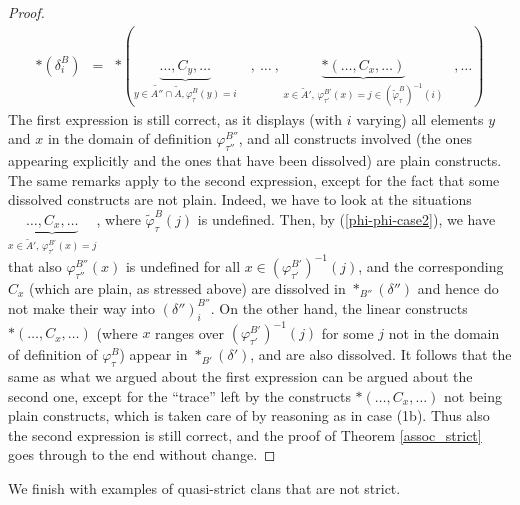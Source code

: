 \documentclass[11pt]{article}
\theoremstyle{definition}
\numberwithin{equation}{section}
\numberwithin{equation}{section}
\newcommand{\plunderline}[1]{#1}
\begin{document}
\begin{proof}
$$\begin{array}{lll}
\ast(\delta_i^{\plunderline{B}}) &=& \ast(\underbrace{\ldots ,C_{y},\ldots}_{y\in \widetilde{A''}\cap \tilde{A},\varphi_{\tau}^{\plunderline{B}}(y)=i}\,\,\,\,\,\,,\:\ldots\:,\,\underbrace{\ast(\ldots ,C_x,\ldots)}_{x\in \tilde{A}',\, \varphi^{\plunderline{B'}}_{\tau'}(x)=j\in (\tilde{\varphi}_{\tau}^{\plunderline{B}})^{-1}(i)}  \,\,\,\;,\ldots)
 \end{array}$$
 The   first expression is still correct, as it displays (with $i$ varying) all elements $y$ and $x$ in the domain of definition $\varphi_{\tau''}^{B''}$, and all constructs involved (the ones appearing explicitly and the ones that have been dissolved) are plain constructs.  The same remarks apply to the second expression, except for the fact that some dissolved constructs are not plain.
 Indeed, we have to look at the  situations $\underbrace{\ldots, C_x ,\ldots}_{x\in \tilde{A}',\, \varphi^{\plunderline{B'}}_{\tau'}(x)=j}$, where 
$\tilde{\varphi}_{\tau}^{\plunderline{B}}(j)$ is undefined.  Then, by (\ref{phi-phi-case2}), we have that  also  $\varphi_{\tau''}^{B''}(x)$ is undefined for all $x\in(\varphi_{\tau'}^{B'})^{-1}(j)$, and 
the corresponding $C_x$  (which are plain, as stressed above) are dissolved  in  $\ast_{B''}(\delta'')$ and hence do not make their way into $(\delta'')^{B''}_{i}$.
On the other hand, the linear constructs  $\ast(\ldots ,C_x,\ldots)$ (where $x$ ranges over $(\varphi_{\tau'}^{B'})^{-1}(j)$ for some $j$ not in the domain of definition of $\varphi_\tau^B$) appear in  $\ast_{B'}(\delta')$, and are also dissolved. 
It follows that the same as what we argued about the first expression  can be argued about  the second one, except for 
the ``trace'' left by the constructs $\ast(\ldots ,C_x,\ldots)$ not being plain constructs, which is taken care of by  reasoning as in case (1b).
Thus also the second expression is  still correct, and the proof of Theorem \ref{assoc_strict}  goes through to the end without change.
\end{proof}
We finish with examples of quasi-strict clans that are not strict. 
\end{document}
